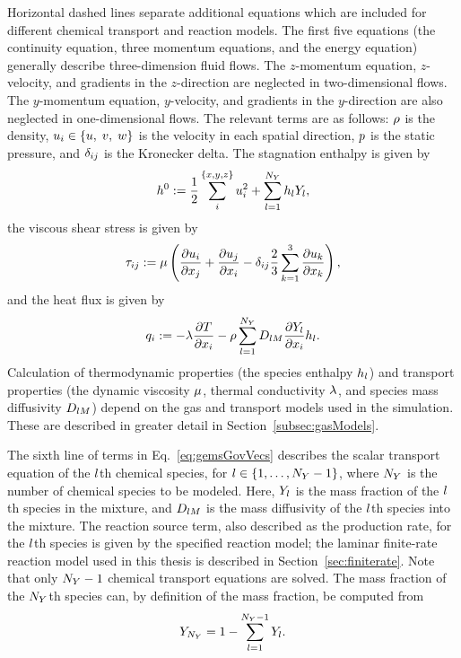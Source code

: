 %
Horizontal dashed lines separate additional equations which are included for different chemical transport and reaction models. The first five equations (the continuity equation, three momentum equations, and the energy equation) generally describe three-dimension fluid flows. The $z$-momentum equation, $z$-velocity, and gradients in the $z$-direction are neglected in two-dimensional flows. The $y$-momentum equation, $y$-velocity, and gradients in the $y$-direction are also neglected in one-dimensional flows. The relevant terms are as follows: $\rho$ is the density, $u_{i} \in \{u, \; v, \; w\}$ is the velocity in each spatial direction, $p$ is the static pressure, and $\delta_{i j}$ is the Kronecker delta. The stagnation enthalpy is given by
%
\begin{equation}\label{eq:stagEnth}
	h^0 := \frac{1}{2} \sum_{i}^{\{x,y,z\}} u_{i}^2 + \sum_{l = 1}^{N_Y} h_{l} Y_{l},
\end{equation}
%
the viscous shear stress is given by
%
\begin{equation}\label{eq:shearStress}
	\tau_{i j} := \mu \left( \frac{\partial u_{i}}{\partial x_{j}} + \frac{\partial u_{j}}{\partial x_{i}} - \delta_{i j} \frac{2}{3} \sum_{k=1}^3 \frac{\partial u_{k}}{\partial x_{k}} \right),
\end{equation}
%
and the heat flux is given by
%
\begin{equation}\label{eq:heatFlux}
	q_{i} := -\lambda \frac{\partial T}{\partial x_{i}} - \rho \sum_{l = 1}^{N_Y} D_{l M} \frac{\partial Y_{l}}{\partial x_{i}} h_{l}.
\end{equation}
%
Calculation of thermodynamic properties (the species enthalpy $h_{l}$) and transport properties (the dynamic viscosity $\mu$, thermal conductivity $\lambda$, and species mass diffusivity $D_{l M}$) depend on the gas and transport models used in the simulation. These are described in greater detail in Section~\ref{subsec:gasModels}.

The sixth line of terms in Eq.~\ref{eq:gemsGovVecs} describes the scalar transport equation of the $l$th chemical species, for $l \in \{1, \hdots, N_Y - 1\}$, where $N_Y$ is the number of chemical species to be modeled. Here, $Y_{l}$ is the mass fraction of the $l$th species in the mixture, and $D_{l M}$ is the mass diffusivity of the $l$th species into the mixture. The reaction source term, also described as the production rate, for the $l$th species is given by the specified reaction model; the laminar finite-rate reaction model used in this thesis is described in Section~\ref{sec:finiterate}. Note that only $N_Y - 1$ chemical transport equations are solved. The mass fraction of the $N_Y$th species can, by definition of the mass fraction, be computed from
%
\begin{equation}
	Y_{N_Y} = 1 - \sum_{l = 1}^{N_Y-1} Y_{l}.
\end{equation}

